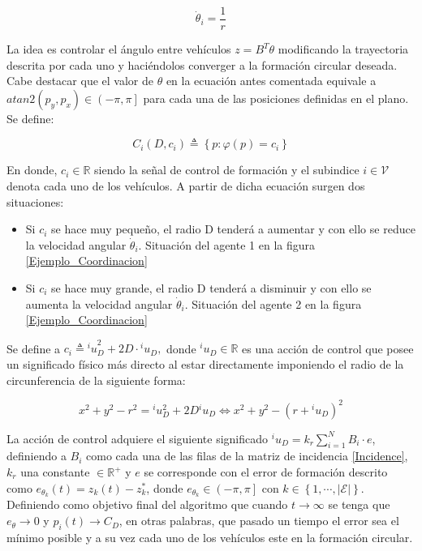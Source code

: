 \begin{equation}
	\dot{\theta}_i=\frac{1}{r}
\end{equation}

La idea es controlar el ángulo entre vehículos $z = B^{T}\theta$ modificando la trayectoria descrita por cada uno y haciéndolos converger a la formación circular deseada. Cabe destacar que el valor de $\theta$ en la ecuación antes comentada equivale a $atan2(p_y,p_x)\in\left(-\pi,\pi\right]$ para cada una de las posiciones definidas en el plano. Se define:

\begin{equation}\label{Control}
	C_i\left(D,c_{i}\right)\triangleq\left\lbrace{p:\varphi\left(p\right)=c_{i}}\right\rbrace
\end{equation}

En donde, $c_i \in \mathbb{R}$ siendo la señal de control de formación y el subindice $i\in\mathcal{V}$ denota cada uno de los vehículos. A partir de dicha ecuación surgen dos situaciones:
\newpage

\begin{itemize}
	\item Si $c_i$ se hace muy pequeño, el radio D tenderá a aumentar y con ello se reduce la velocidad angular $\dot{\theta}_i$. Situación del agente 1 en la figura \ref{Ejemplo_Coordinacion}
	\item Si $c_i$ se hace muy grande, el radio D tenderá a disminuir y con ello se aumenta la velocidad angular $\dot{\theta}_i$. Situación del agente 2 en la figura \ref{Ejemplo_Coordinacion}
\end{itemize}

Se define a $c_i\triangleq{^{i}u}_{D}^{2}+2D\cdot{^i}u_{D},$ donde $^{i}u_{D}\in\mathbb{R}$ es una acción de control que posee un significado físico más directo al estar directamente imponiendo el radio de la circunferencia de la siguiente forma:

\begin{equation}
	x^2+y^2-r^2={^{i}}u_{D}^{2}+2D{^{i}}u_{D} \Leftrightarrow x^2+y^2-(r+{^{i}}u_{D})^2
\end{equation}

La acción de control adquiere el siguiente significado ${^{i}}{u}_{D}=k_{r}\sum_{i=1}^N{B_i}\cdot{e}$, definiendo a $B_i$ como cada una de las filas de la matriz de incidencia \ref{Incidence}, $k_r$ una constante $\in\mathbb{R}^{+}$ y $e$ se corresponde con el error de formación descrito como $e_{\theta_{k}}\left(t\right)=z_k\left(t\right)-z_{k}^*$, donde $e_{\theta_{k}}\in\left(-\pi,\pi\right]$ con $k\in\left\lbrace{1,\cdots,|\mathcal{E}|}\right\rbrace$. Definiendo como objetivo final del algoritmo que cuando $t\rightarrow\infty$ se tenga que $e_{\theta}\rightarrow{0}$ y $p_{i}\left(t\right)\rightarrow{C_D}$, en otras palabras, que pasado un tiempo el error sea el mínimo posible y a su vez cada uno de los vehículos este en la formación circular.

